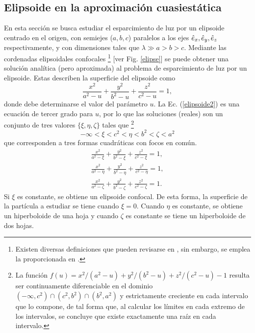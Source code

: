 \subsection{Elipsoide en la aproximación cuasiestática}
En esta sección se busca estudiar el esparcimiento de luz por un elipsoide centrado en el origen, con semiejes ($a,b,c$) paralelos a los ejes $\hat{e}_{x},\hat{e}_{y},\hat{e}_{z}$ respectivamente, y con dimensiones tales que $\lambda\gg a>b>c$. Mediante las cordenadas elipsoidales confocales \footnote{Existen diversas definiciones que pueden revisarse en \cite{Math}, sin embargo, se emplea la proporcionada en \cite{Arfken}. } [ver Fig. \ref{elipse}] se puede obtener una solución analítica (pero aproximada) al problema de esparcimiento de luz por un elipsoide. Estas describen la superficie del elipsoide como \cite{Math}
\begin{equation}
	\frac{x^2}{a^2-u}+\frac{y^2}{b^2-u}+\frac{z^2}{c^2-u}=1,
	\label{elipsoide2}
\end{equation}
 donde debe determinarse el valor del parámetro $u$. La Ec. (\ref{elipsoide2}) es una ecuación de tercer grado para $u$, por lo que las soluciones (reales) son un conjunto de tres valores $\{\xi,\eta,\zeta\}$ tales que \footnote{La función $f(u)=x^2/(a^2-u)+y^2/(b^2-u)+z^2/(c^2-u)-1$ resulta ser continuamente diferenciable en el dominio $(-\infty, c^2)\cap (c^2, b^2)\cap (b^2, a^2)$ y estrictamente creciente en cada intervalo que lo compone, de tal forma que, al calcular los límites en cada extremo de los intervalos, se concluye que existe exactamente una raíz en cada intervalo.}
\begin{equation}
	-\infty<\xi<c^2<\eta<b^2<\zeta<a^2
\end{equation}
que corresponden a tres formas cuadráticas con focos en común.
\begin{align}
    \frac{x^2}{a^2-\xi}+\frac{y^2}{b^2-\xi}+\frac{z^2}{c^2-\xi}=1,\\
    \frac{x^2}{a^2-\eta}+\frac{y^2}{b^2-\eta}+\frac{z^2}{c^2-\eta}=1,\\
    \frac{x^2}{a^2-\zeta}+\frac{y^2}{b^2-\zeta}+\frac{z^2}{c^2-\zeta}=1.
\end{align}
Si $\xi$ es constante, se obtiene un elipsoide confocal. De esta forma, la superficie de la partícula a estudiar se tiene cuando $\xi=0$. Cuando $\eta$ es constante, se obtiene un hiperboloide de una hoja y cuando $\zeta$ es constante se tiene un hiperboloide de dos hojas.\\

